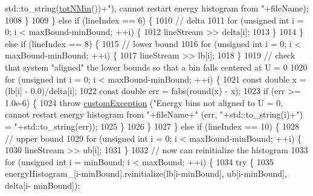\begin{DoxyCode}
      std::to\_string(\hyperlink{classsim_system_af10842e0eaa638373b8717c87b47e6bc}{totNMin}())+\textcolor{stringliteral}{"), cannot restart energy histogram from "}+fileName);
1008             \}
1009         \} \textcolor{keywordflow}{else} \textcolor{keywordflow}{if} (lineIndex == 6) \{
1010             \textcolor{comment}{// delta}
1011             \textcolor{keywordflow}{for} (\textcolor{keywordtype}{unsigned} \textcolor{keywordtype}{int} i = 0; i < maxBound-minBound; ++i) \{
1012                 lineStream >> delta[i];
1013             \}
1014         \} \textcolor{keywordflow}{else} \textcolor{keywordflow}{if} (lineIndex == 8) \{
1015             \textcolor{comment}{// lower bound}
1016             \textcolor{keywordflow}{for} (\textcolor{keywordtype}{unsigned} \textcolor{keywordtype}{int} i = 0; i < maxBound-minBound; ++i) \{
1017                 lineStream >> lb[i];
1018             \}
1019             \textcolor{comment}{// check that system "aligned" the lower bounds so that a bin falls centered at U = 0}
1020             \textcolor{keywordflow}{for} (\textcolor{keywordtype}{unsigned} \textcolor{keywordtype}{int} i = 0; i < maxBound-minBound; ++i) \{
1021                 \textcolor{keyword}{const} \textcolor{keywordtype}{double} x = (lb[i] - 0.0)/delta[i];
1022                 \textcolor{keyword}{const} \textcolor{keywordtype}{double} err = fabs(round(x) - x);
1023                 \textcolor{keywordflow}{if} (err >= 1.0e-6) \{
1024                     \textcolor{keywordflow}{throw} \hyperlink{classcustom_exception}{customException} (\textcolor{stringliteral}{"Energy bins not aligned to U = 0, cannot restart
       energy histogram from "}+fileName+\textcolor{stringliteral}{" (err, "}+std::to\_string(i)+\textcolor{stringliteral}{") = "}+std::to\_string(err));
1025                 \}
1026             \}
1027         \} \textcolor{keywordflow}{else} \textcolor{keywordflow}{if} (lineIndex == 10) \{
1028             \textcolor{comment}{// upper bound}
1029             \textcolor{keywordflow}{for} (\textcolor{keywordtype}{unsigned} \textcolor{keywordtype}{int} i = 0; i < maxBound-minBound; ++i) \{
1030                 lineStream >> ub[i];
1031             \}
1032             \textcolor{comment}{// now can reinitialize the histogram}
1033             \textcolor{keywordflow}{for} (\textcolor{keywordtype}{unsigned} \textcolor{keywordtype}{int} i = minBound; i < maxBound; ++i) \{
1034                 \textcolor{keywordflow}{try} \{
1035                     energyHistogram\_[i-minBound].reinitialize(lb[i-minBound], ub[i-minBound], delta[i-
      minBound]);

\end{DoxyCode}
